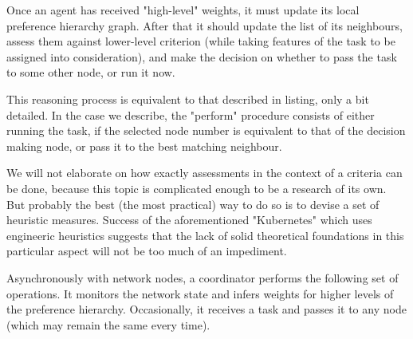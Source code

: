 Once an agent has received "high-level" weights, it must update its local preference hierarchy graph.
After that it should update the list of its neighbours, assess them against lower-level criterion (while taking features of the task to be assigned into consideration), and make the decision on whether to pass the task to some other node, or run it now.

This reasoning process is equivalent to that described in listing, only a bit detailed.
In the case we describe, the "perform" procedure consists of either running the task, if the selected node number is equivalent to that of the decision making node, or pass it to the best matching neighbour.

We will not elaborate on how exactly assessments in the context of a criteria can be done, because this topic is complicated enough to be a research of its own.
But probably the best (the most practical) way to do so is to devise a set of heuristic measures.
Success of the aforementioned "Kubernetes" which uses engineeric heuristics suggests that the lack of solid theoretical foundations in this particular aspect will not be too much of an impediment.

Asynchronously with network nodes, a coordinator performs the following set of operations. It monitors the network state and infers weights for higher levels of the preference hierarchy. Occasionally, it receives a task and passes it to any node (which may remain the same every time).
